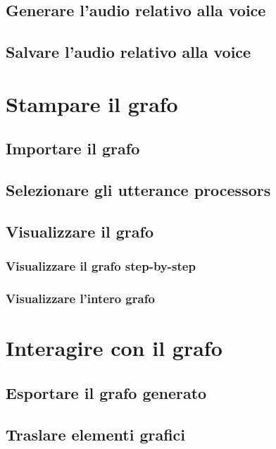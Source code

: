 \documentclass[openany,12pt,a4paper]{report}
\begin{document}
	\subsection{Generare l'audio relativo alla voice}
	
	\subsection{Salvare l'audio relativo alla voice}
	
	\section{Stampare il grafo}
	
	\subsection{Importare il grafo}
	
	\subsection{Selezionare gli utterance processors}
	
	\subsection{Visualizzare il grafo}
	
	\subsubsection{Visualizzare il grafo step-by-step}
	
	\subsubsection{Visualizzare l'intero grafo}
	
	\section{Interagire con il grafo}
	
	\subsection{Esportare il grafo generato}
	
	\subsection{Traslare elementi grafici}
	
\end{document}
